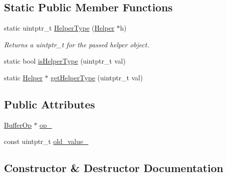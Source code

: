 \subsection*{Static Public Member Functions}
\begin{DoxyCompactItemize}
\item 
static uintptr\+\_\+t \hyperlink{classtervel_1_1containers_1_1wf_1_1_ring_buffer_1_1_helper_ae04b46af093b7546aa05a9ce7a8533a9}{Helper\+Type} (\hyperlink{classtervel_1_1containers_1_1wf_1_1_ring_buffer_1_1_helper}{Helper} $\ast$h)
\begin{DoxyCompactList}\small\item\em Returns a uintptr\+\_\+t for the passed helper object. \end{DoxyCompactList}\item 
static bool \hyperlink{classtervel_1_1containers_1_1wf_1_1_ring_buffer_1_1_helper_aa375dafb087de1a4b6ad9d2164f390ea}{is\+Helper\+Type} (uintptr\+\_\+t val)
\item 
static \hyperlink{classtervel_1_1containers_1_1wf_1_1_ring_buffer_1_1_helper}{Helper} $\ast$ \hyperlink{classtervel_1_1containers_1_1wf_1_1_ring_buffer_1_1_helper_a4a392baf1637042a60e743b306b9399f}{get\+Helper\+Type} (uintptr\+\_\+t val)
\end{DoxyCompactItemize}
\subsection*{Public Attributes}
\begin{DoxyCompactItemize}
\item 
\hyperlink{classtervel_1_1containers_1_1wf_1_1_ring_buffer_1_1_buffer_op}{Buffer\+Op} $\ast$ \hyperlink{classtervel_1_1containers_1_1wf_1_1_ring_buffer_1_1_helper_acdb1064476d7cbc7cc18492aa2a2d9ea}{op\+\_\+}
\item 
const uintptr\+\_\+t \hyperlink{classtervel_1_1containers_1_1wf_1_1_ring_buffer_1_1_helper_a9669431287884c83f20afb6c16446a6c}{old\+\_\+value\+\_\+}
\end{DoxyCompactItemize}


\subsection{Constructor \& Destructor Documentation}
\hypertarget{classtervel_1_1containers_1_1wf_1_1_ring_buffer_1_1_helper_a727b15617f6bd482ae200aad29e9a062}{}
